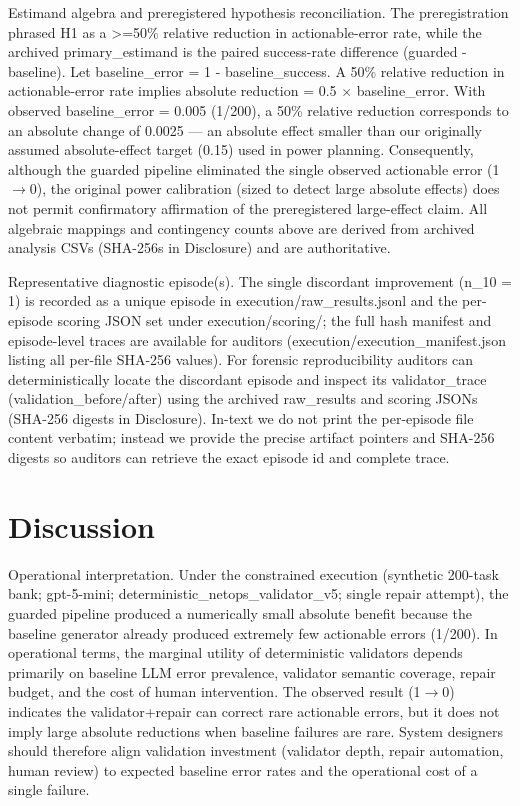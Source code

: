 \documentclass[conference]{IEEEtran}
\begin{document}
Estimand algebra and preregistered hypothesis reconciliation. The preregistration phrased H1 as a >=50\% relative reduction in actionable-error rate, while the archived primary\_estimand is the paired success-rate difference (guarded - baseline). Let baseline\_error = 1 - baseline\_success. A 50\% relative reduction in actionable-error rate implies absolute reduction = 0.5 \ensuremath{\times} baseline\_error. With observed baseline\_error = 0.005 (1/200), a 50\% relative reduction corresponds to an absolute change of 0.0025 --- an absolute effect smaller than our originally assumed absolute-effect target (0.15) used in power planning. Consequently, although the guarded pipeline eliminated the single observed actionable error (1\ensuremath{\rightarrow}0), the original power calibration (sized to detect large absolute effects) does not permit confirmatory affirmation of the preregistered large-effect claim. All algebraic mappings and contingency counts above are derived from archived analysis CSVs (SHA-256s in Disclosure) and are authoritative.

Representative diagnostic episode(s). The single discordant improvement (n\_10 = 1) is recorded as a unique episode in execution/raw\_results.jsonl and the per-episode scoring JSON set under execution/scoring/; the full hash manifest and episode-level traces are available for auditors (execution/execution\_manifest.json listing all per-file SHA-256 values). For forensic reproducibility auditors can deterministically locate the discordant episode and inspect its validator\_trace (validation\_before/after) using the archived raw\_results and scoring JSONs (SHA-256 digests in Disclosure). In-text we do not print the per-episode file content verbatim; instead we provide the precise artifact pointers and SHA-256 digests so auditors can retrieve the exact episode id and complete trace.

\section{Discussion}
Operational interpretation. Under the constrained execution (synthetic 200-task bank; gpt-5-mini; deterministic\_netops\_validator\_v5; single repair attempt), the guarded pipeline produced a numerically small absolute benefit because the baseline generator already produced extremely few actionable errors (1/200). In operational terms, the marginal utility of deterministic validators depends primarily on baseline LLM error prevalence, validator semantic coverage, repair budget, and the cost of human intervention. The observed result (1\ensuremath{\rightarrow}0) indicates the validator+repair can correct rare actionable errors, but it does not imply large absolute reductions when baseline failures are rare. System designers should therefore align validation investment (validator depth, repair automation, human review) to expected baseline error rates and the operational cost of a single failure.
\end{document}
